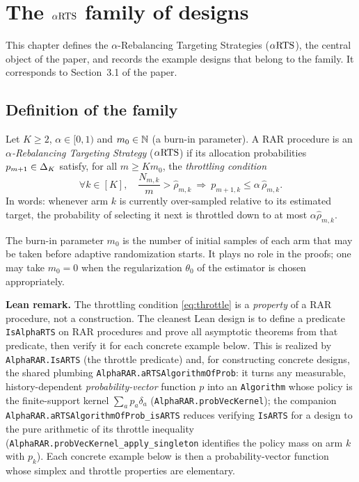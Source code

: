 \chapter{The \texorpdfstring{$\alpha\text{RTS}$}{aRTS} family of designs}
\label{chap:design}

This chapter defines the $\alpha$-Rebalancing Targeting Strategies ($\alpha\text{RTS}$),
the central object of the paper, and records the example designs that belong to
the family. It corresponds to Section~3.1 of the paper.

\section{Definition of the family}
\label{sec:design_def}

\begin{definition}\label{def:aRTS}
Let $K \ge 2$, $\alpha \in [0,1)$ and $m_0 \in \mathbb{N}$ (a burn-in parameter).
A RAR procedure is an \emph{$\alpha$-Rebalancing Targeting Strategy} ($\alpha\text{RTS}$)
if its allocation probabilities $p_{m+1} \in \Delta_K$ satisfy, for all
$m \ge K m_0$, the \emph{throttling condition}
\begin{equation}\label{eq:throttle}
  \forall k \in [K], \quad
  \frac{N_{m,k}}{m} > \hat{\rho}_{m,k}
  \ \Longrightarrow\
  p_{m+1,k} \le \alpha\, \hat{\rho}_{m,k}.
\end{equation}
In words: whenever arm $k$ is currently over-sampled relative to its estimated
target, the probability of selecting it next is throttled down to at most
$\alpha \hat{\rho}_{m,k}$.
\end{definition}

\begin{remark}\label{rem:burnin}
The burn-in parameter $m_0$ is the number of initial samples of each arm that
may be taken before adaptive randomization starts. It plays no role in the
proofs; one may take $m_0 = 0$ when the regularization $\theta_0$ of the
estimator is chosen appropriately.
\end{remark}

\textbf{Lean remark.} The throttling condition \eqref{eq:throttle} is a
\emph{property} of a RAR procedure, not a construction. The cleanest Lean design
is to define a predicate \texttt{IsAlphaRTS} on RAR procedures and prove all
asymptotic theorems from that predicate, then verify it for each concrete
example below. This is realized by \texttt{AlphaRAR.IsARTS} (the throttle predicate) and, for
constructing concrete designs, the shared plumbing
\texttt{AlphaRAR.aRTSAlgorithmOfProb}: it turns any measurable, history-dependent
\emph{probability-vector} function $p$ into an \texttt{Algorithm} whose policy is the finite-support
kernel $\sum_a p_a \delta_a$ (\texttt{AlphaRAR.probVecKernel}); the companion
\texttt{AlphaRAR.aRTSAlgorithmOfProb\_isARTS} reduces verifying \texttt{IsARTS} for a design to the
pure arithmetic of its throttle inequality (\texttt{AlphaRAR.probVecKernel\_apply\_singleton}
identifies the policy mass on arm $k$ with $p_k$). Each concrete example below is then a
probability-vector function whose simplex and throttle properties are elementary.

